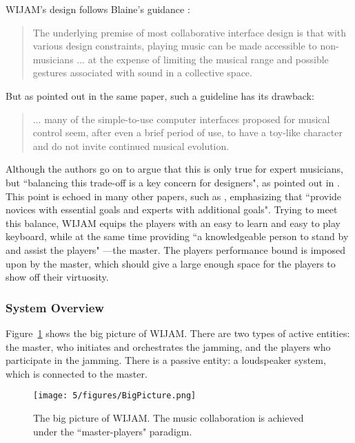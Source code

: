WIJAM's design follows Blaine's guidance \cite{Blaine2003}:
\begin{quote}
The underlying premise of most collaborative interface design is that with various design constraints, playing music can be made accessible to non-musicians ... at the expense of limiting the musical range and possible gestures associated with sound in a collective space. \end{quote}
But as pointed out in the same paper, such a guideline has its drawback:
\begin{quote}
... many of the simple-to-use computer interfaces proposed for musical control seem, after even a brief period of use, to have a toy-like
character and do not invite continued musical evolution.
\end{quote}
Although the authors go on to argue that this is only true for expert musicians, but ``balancing this trade-off is a key concern for designers", as pointed out in \cite{blaine2003collaborative}. This point is echoed in many other papers, such as \cite{xambo2011multi}, emphasizing that ``provide novices with essential goals and experts with additional goals". Trying to meet this balance, WIJAM equips the players with an easy to learn and easy to play keyboard, while at the same time providing ``a knowledgeable person to stand by and assist the players" \cite{Blaine2003}---the master. The players performance bound is imposed upon by the master, which should give a large enough space for the players to show off their virtuosity.

\subsubsection{System Overview}

Figure~\ref{fig:5-BigPicture} shows the big picture of WIJAM. There are two types of active entities: the master, who initiates and orchestrates the jamming, and the players who participate in the jamming. There is a passive entity: a loudspeaker system, which is connected to the master.

\begin{figure}[htbp]
    \centering
        \texttt{[image: 5/figures/BigPicture.png]}
    \caption{The big picture of WIJAM. The music collaboration is achieved under the ``master-players" paradigm.}
    \label{fig:5-BigPicture}
\end{figure}

